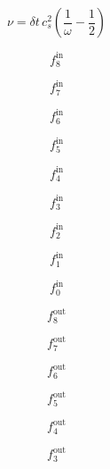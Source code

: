 \documentclass[a4paper,11pt]{article}
\begin{document}
\begin{equation}
\nu = \delta t\,c_s^2\left(\frac{1}{\omega}-\frac{1}{2}\right)
\end{equation}

\begin{equation}
f_8^\mathrm{in}
\end{equation}

\begin{equation}
f_7^\mathrm{in}
\end{equation}

\begin{equation}
f_6^\mathrm{in}
\end{equation}

\begin{equation}
f_5^\mathrm{in}
\end{equation}

\begin{equation}
f_4^\mathrm{in}
\end{equation}

\begin{equation}
f_3^\mathrm{in}
\end{equation}

\begin{equation}
f_2^\mathrm{in}
\end{equation}

\begin{equation}
f_1^\mathrm{in}
\end{equation}

\begin{equation}
f_0^\mathrm{in}
\end{equation}

\begin{equation}
f_8^\mathrm{out}
\end{equation}

\begin{equation}
f_7^\mathrm{out}
\end{equation}

\begin{equation}
f_6^\mathrm{out}
\end{equation}

\begin{equation}
f_5^\mathrm{out}
\end{equation}

\begin{equation}
f_4^\mathrm{out}
\end{equation}

\begin{equation}
f_3^\mathrm{out}
\end{equation}
\end{document}
